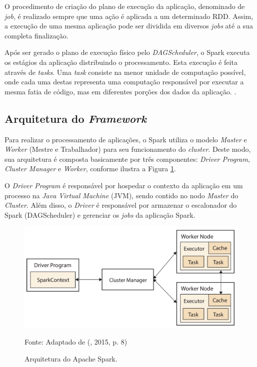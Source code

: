 O procedimento de criação do plano de execução da aplicação, denominado de \textit{job}, é realizado sempre que uma ação é aplicada a um determinado RDD. Assim, a execução de uma mesma aplicação pode ser dividida em diversos \textit{jobs} até a sua completa finalização.

Após ser gerado o plano de execução físico pelo \textit{DAGScheduler}, o Spark executa os estágios da aplicação distribuindo o processamento. Esta execução é feita através de \textit{tasks}. Uma \textit{task} consiste na menor unidade de computação possível, onde cada uma destas representa uma computação responsável por executar a mesma fatia de código, mas em diferentes porções dos dados da aplicação. \cite{karau2017high}.

\subsection{Arquitetura do \textit{Framework}}
Para realizar o processamento de aplicações, o Spark  utiliza o modelo \textit{Master} e \textit{Worker} (Mestre e Trabalhador) para seu funcionamento do \textit{cluster}. Deste modo, sua arquitetura é composta basicamente por três componentes: \textit{Driver Program}, \textit{Cluster Manager} e \textit{Worker}, conforme ilustra a Figura \ref{fig:spark_arquitetura}.

O \textit{Driver Program} é responsável por hospedar o contexto da aplicação em um processo na \textit{Java Virtual Machine} (JVM), sendo contido no nodo \textit{Master} do \textit{Cluster}. Além disso, o \textit{Driver} é responsável por armazenar o escalonador do Spark (DAGScheduler) e gerenciar os \textit{jobs} da aplicação Spark. 

\begin{figure}[!ht]
    \caption{Arquitetura do Apache Spark.}
    \begin{center}
        \includegraphics[scale=0.32]{imagens/spark_arquitetura.pdf}
    \end{center}
    \small{Fonte: Adaptado de (\citeauthor{frampton2015mastering}, 2015, p. 8)}
    \label{fig:spark_arquitetura}
\end{figure}



